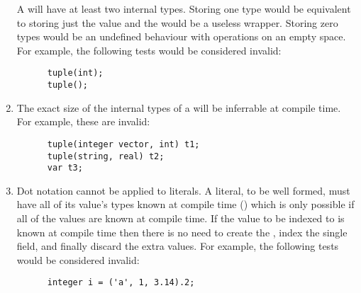 \documentclass[../gazprea.tex]{subfiles}
\begin{document}
\begin{enumerate}
    A  will have at least two internal types. Storing one type would be equivalent to
    storing just the value and the  would be a useless wrapper. Storing zero types would
    be an undefined behaviour with operations on an empty space. For example, the following tests
    would be considered invalid:
    \begin{lstlisting}
      tuple(int);
      tuple();
    \end{lstlisting}
  \item
    The exact size of the internal types of a  will be inferrable at compile time. For
    example, these are invalid:
    \begin{lstlisting}
      tuple(integer vector, int) t1;
      tuple(string, real) t2;
      var t3;
    \end{lstlisting}
  \item
    Dot notation cannot be applied to  literals. A  literal, to be well
    formed, must have all of its value's types known at compile time
    () which is only possible if all of the values are known at
    compile time. If the value to be indexed to is known at compile time then there is no need to
    create the , index the single field, and finally discard the extra values. For
    example, the following tests would be considered invalid:
    \begin{lstlisting}
      integer i = ('a', 1, 3.14).2;
    \end{lstlisting}
\end{enumerate}
\end{document}
